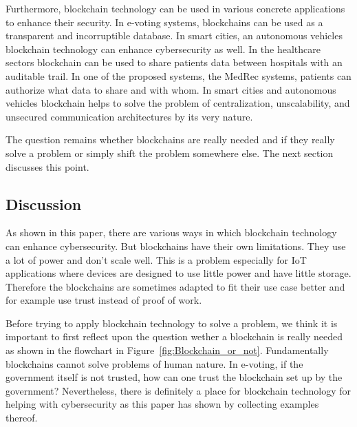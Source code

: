 Furthermore, blockchain technology can be used in various concrete applications to enhance their security.
In e-voting systems, blockchains can be used as a transparent and incorruptible database.
In smart cities, an autonomous vehicles blockchain technology can enhance cybersecurity as well.
In the healthcare sectors blockchain can be used to share patients data between hospitals with an auditable trail. In one of the proposed systems, the MedRec systems, patients can authorize what data to share and with whom.
In smart cities and autonomous vehicles blockchain helps to solve the problem of centralization, unscalability,
and unsecured communication architectures by its very nature.

The question remains whether blockchains are really needed and if they really solve a problem or simply shift the problem somewhere else. The next section discusses this point.

\subsection{Discussion}

As shown in this paper, there are various ways in which blockchain technology can enhance cybersecurity.
But blockchains have their own limitations. They use a lot of power and don't scale well. This is a problem especially for IoT applications where devices are designed to use little power and have little storage. Therefore the blockchains are sometimes adapted to fit their use case better and for example use trust instead of proof of work.

Before trying to apply blockchain technology to solve a problem, we think it is important to first reflect upon the question wether a blockchain is really needed as shown in the flowchart in Figure~\ref{fig:Blockchain_or_not}.
Fundamentally blockchains cannot solve problems of human nature. In e-voting, if the government itself is not trusted, how can one trust the blockchain set up by the government? Nevertheless, there is definitely a place for blockchain technology for helping with cybersecurity as this paper has shown by collecting examples thereof.








